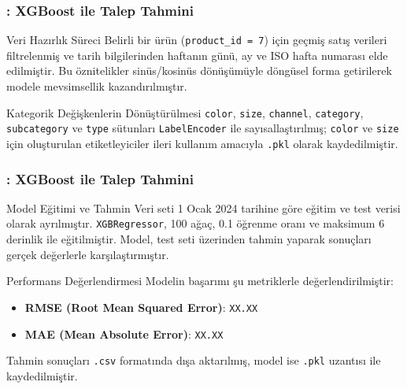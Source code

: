 \documentclass[12pt]{beamer}
\begin{document}
	\begin{frame}
		\frametitle{\insertsection: XGBoost ile Talep Tahmini}
		\begin{block}{Veri Hazırlık Süreci}
			Belirli bir ürün (\texttt{product\_id = 7}) için geçmiş satış verileri filtrelenmiş ve tarih bilgilerinden haftanın günü, ay ve ISO hafta numarası elde edilmiştir. Bu öznitelikler sinüs/kosinüs dönüşümüyle döngüsel forma getirilerek modele mevsimsellik kazandırılmıştır.
		\end{block}
		
		\vspace{0.5em}
		
		\begin{block}{Kategorik Değişkenlerin Dönüştürülmesi}
			\texttt{color}, \texttt{size}, \texttt{channel}, \texttt{category}, \texttt{subcategory} ve \texttt{type} sütunları \texttt{LabelEncoder} ile sayısallaştırılmış; \texttt{color} ve \texttt{size} için oluşturulan etiketleyiciler ileri kullanım amacıyla \texttt{.pkl} olarak kaydedilmiştir.
		\end{block}
	\end{frame}
	
	\begin{frame}
		\frametitle{\insertsection: XGBoost ile Talep Tahmini}
		\begin{block}{Model Eğitimi ve Tahmin}
			Veri seti 1 Ocak 2024 tarihine göre eğitim ve test verisi olarak ayrılmıştır. \texttt{XGBRegressor}, 100 ağaç, 0.1 öğrenme oranı ve maksimum 6 derinlik ile eğitilmiştir. Model, test seti üzerinden tahmin yaparak sonuçları gerçek değerlerle karşılaştırmıştır.
		\end{block}
		
		\vspace{0.5em}
		
		\begin{block}{Performans Değerlendirmesi}
			Modelin başarımı şu metriklerle değerlendirilmiştir:
			\begin{itemize}
				\item \textbf{RMSE (Root Mean Squared Error)}: \texttt{XX.XX}
				\item \textbf{MAE (Mean Absolute Error)}: \texttt{XX.XX}
			\end{itemize}
			Tahmin sonuçları \texttt{.csv} formatında dışa aktarılmış, model ise \texttt{.pkl} uzantısı ile kaydedilmiştir.
		\end{block}
	\end{frame}
	
\end{document}
